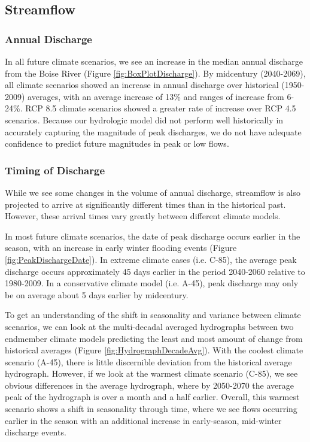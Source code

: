 \documentclass[11pt,letterpaper]{article}
\begin{document}
\subsection{Streamflow}

\subsubsection{Annual Discharge}

In all future climate scenarios, we see an increase in the median annual discharge from the Boise River (Figure \ref{fig:BoxPlotDischarge}). By midcentury (2040-2069), all climate scenarios showed an increase in annual discharge over historical (1950-2009) averages, with an average increase of 13\% and ranges of increase from 6-24\%. RCP 8.5 climate scenarios showed a greater rate of increase over RCP 4.5 scenarios. Because our hydrologic model did not perform well historically in accurately capturing the magnitude of peak discharges, we do not have adequate confidence to predict future magnitudes in peak or low flows. 

\subsubsection{Timing of Discharge}

While we see some changes in the volume of annual discharge, streamflow is also projected to arrive at significantly different times than in the historical past. However, these arrival times vary greatly between different climate models.

In most future climate scenarios, the date of peak discharge occurs earlier in the season, with an increase in early winter flooding events (Figure \ref{fig:PeakDischargeDate}). In extreme climate cases (i.e. C-85), the average peak discharge occurs approximately 45 days earlier in the period 2040-2060 relative to 1980-2009. In a conservative climate model (i.e. A-45), peak discharge may only be on average about 5 days earlier by midcentury. 

To get an understanding of the shift in seasonality and variance between climate scenarios, we can look at the multi-decadal averaged hydrographs between two endmember climate models predicting the least and most amount of change from historical averages (Figure \ref{fig:HydrographDecadeAvg}). With the coolest climate scenario (A-45), there is little discernible deviation from the historical average hydrograph. However, if we look at the warmest climate scenario (C-85), we see obvious differences in the average hydrograph, where by 2050-2070 the average peak of the hydrograph is over a month and a half earlier. Overall, this warmest scenario shows a shift in seasonality through time, where we see flows occurring earlier in the season with an additional increase in early-season, mid-winter discharge events.
\end{document}
